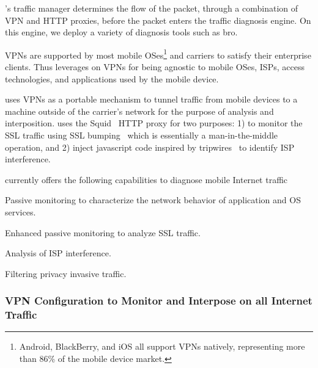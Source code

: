 \meddle's traffic manager determines the flow of the packet, through a combination of VPN and HTTP proxies, before the packet enters the traffic diagnosis engine. 
On this engine, we deploy a variety of diagnosis tools such as bro. 



VPNs are supported by most mobile OSes\footnote{Android, BlackBerry, and iOS all support VPNs natively, representing more than 86\% of the mobile device market\cite{gartner-phone-share}.} and carriers to satisfy their enterprise clients. 
Thus \meddle leverages on VPNs for being agnostic to mobile OSes, ISPs, access technologies, and applications used by the mobile device.


\meddle uses VPNs as a portable mechanism to tunnel traffic from mobile devices to a machine outside of the carrier's network for the purpose of analysis and interposition.
\meddle uses the Squid~\cite{squid} HTTP proxy for two purposes: 1) to monitor the SSL traffic using SSL bumping~\cite{sslbump} which is essentially a man-in-the-middle operation, and 2) inject javascript code inspired by tripwires~\cite{tripwires} to identify ISP interference.

\meddle currently offers the following capabilities to diagnose mobile Internet traffic
\begin{packedenumerate}
\item Passive monitoring to characterize the network behavior of application and OS services. 
\item Enhanced passive monitoring to analyze SSL traffic.
\item Analysis of ISP interference.
\item Filtering privacy invasive traffic. 
\end{packedenumerate}

\subsubsection{VPN Configuration to Monitor and Interpose on all Internet Traffic}
\label{sec:VPN Configuration}

